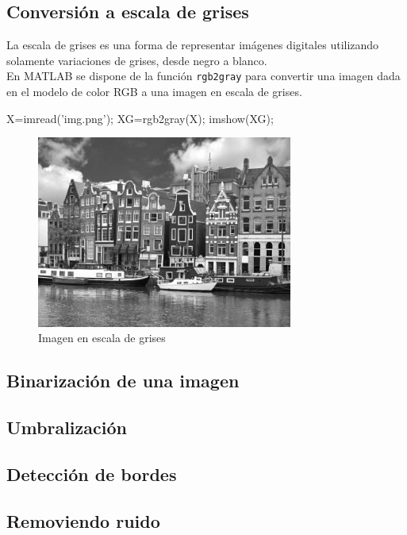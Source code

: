 \subsection{Conversión a escala de grises}

La escala de grises es una forma de representar imágenes digitales
utilizando solamente variaciones de grises, desde negro a blanco. \\

En MATLAB se dispone de la función \texttt{rgb2gray} para convertir una
imagen dada en el modelo de color RGB a una imagen en escala de grises.

\begin{matlab}
X=imread('img.png');
XG=rgb2gray(X);
imshow(XG);
\end{matlab}


\begin{figure}[htbp]
    \centering
    \includegraphics[width=0.75\textwidth]{images/ch7/holland_gris.png}
    \caption{Imagen en escala de grises}
    \label{fig:holland_gris}
\end{figure}

\subsection{Binarización de una imagen}

\subsection{Umbralización}\label{umbralizaciuxf3n}

\subsection{Detección de bordes}\label{detecciuxf3n-de-bordes}

\subsection{Removiendo ruido}\label{removiendo-ruido}